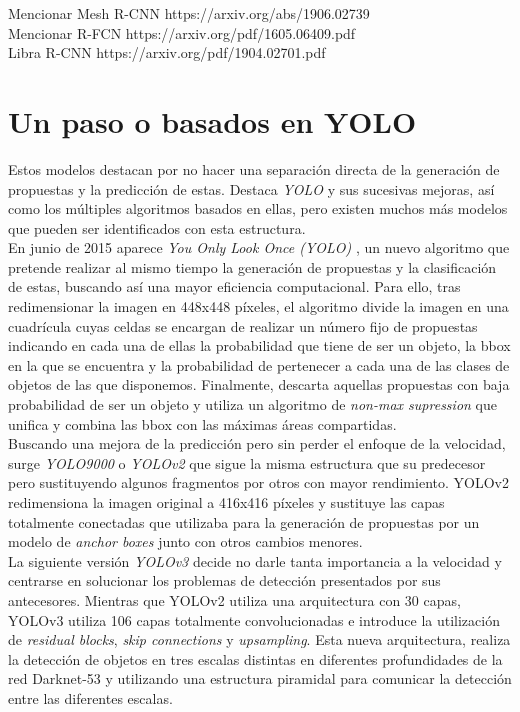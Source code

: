 Mencionar Mesh R-CNN
https://arxiv.org/abs/1906.02739\\
Mencionar R-FCN
https://arxiv.org/pdf/1605.06409.pdf\\
Libra R-CNN
https://arxiv.org/pdf/1904.02701.pdf
\section{Un paso o basados en YOLO}
Estos modelos destacan por no hacer una separación directa de la generación de propuestas y la predicción de estas. Destaca \emph{YOLO} y sus sucesivas mejoras, así como los múltiples algoritmos basados en ellas, pero existen muchos más modelos que pueden ser identificados con esta estructura.\\

En junio de 2015 aparece \emph{You Only Look Once (YOLO)} \cite{2015arXiv150602640R}, un nuevo algoritmo que pretende realizar al mismo tiempo la generación de propuestas y la clasificación de estas, buscando así una mayor eficiencia computacional. Para ello, tras redimensionar la imagen en 448x448 píxeles, el algoritmo divide la imagen en una cuadrícula cuyas celdas se encargan de realizar un número fijo de propuestas indicando en cada una de ellas la probabilidad que tiene de ser un objeto, la bbox en la que se encuentra y la probabilidad de pertenecer a cada una de las clases de objetos de las que disponemos. Finalmente, descarta aquellas propuestas con baja probabilidad de ser un objeto y utiliza un algoritmo de \emph{non-max supression} \cite{2017arXiv170404503B} que unifica y combina las bbox con las máximas áreas compartidas.\\

Buscando una mejora de la predicción pero sin perder el enfoque de la velocidad, surge \emph{YOLO9000} o \emph{YOLOv2} \cite{2016arXiv161208242R} que sigue la misma estructura que su predecesor pero sustituyendo algunos fragmentos por otros con mayor rendimiento. YOLOv2 redimensiona la imagen original a 416x416 píxeles y sustituye las capas totalmente conectadas que utilizaba para la generación de propuestas por un modelo de \emph{anchor boxes} \cite{2015arXiv150601497R} junto con otros cambios menores.\\

La siguiente versión \emph{YOLOv3} \cite{2018arXiv180402767R} decide  no darle tanta importancia a la velocidad y centrarse en solucionar los problemas de detección presentados por sus antecesores. Mientras que YOLOv2 utiliza una arquitectura con 30 capas, YOLOv3 utiliza 106 capas totalmente convolucionadas e introduce la utilización de \emph{residual blocks}, \emph{skip connections} y \emph{upsampling}. Esta nueva arquitectura, realiza la detección de objetos en tres escalas distintas en diferentes profundidades de la red Darknet-53 y utilizando una estructura piramidal \cite{2016arXiv161203144L} para comunicar la detección entre las diferentes escalas.\\

